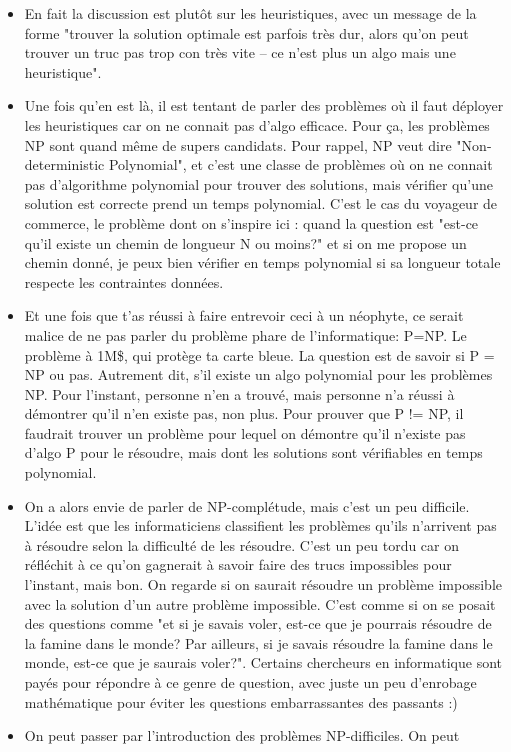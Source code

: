 \documentclass[a4paper]{article}
\begin{document}
\begin{itemize}
\begin{itemize}
\item En fait la discussion est plutôt sur les heuristiques, avec un message de
la forme "trouver la solution optimale est parfois très dur, alors qu'on peut
trouver un truc pas trop con très vite -- ce n'est plus un algo mais une
heuristique".
\item Une fois qu'en est là, il est tentant de parler des problèmes où il faut
déployer les heuristiques car on ne connait pas d'algo efficace. Pour ça, les
problèmes NP sont quand même de supers candidats. Pour rappel, NP veut dire
"Non-deterministic Polynomial", et c'est une classe de problèmes où on ne
connait pas d'algorithme polynomial pour trouver des solutions, mais vérifier
qu'une solution est correcte prend un temps polynomial. C'est le cas du
voyageur de commerce, le problème dont on s'inspire ici : quand la question est
"est-ce qu'il existe un chemin de longueur N ou moins?" et si on me propose un
chemin donné, je peux bien vérifier en temps polynomial si sa longueur totale
respecte les contraintes données.
\item Et une fois que t'as réussi à faire entrevoir ceci à un néophyte, ce
serait malice de ne pas parler du problème phare de l'informatique: P=NP. Le
problème à 1M\$, qui protège ta carte bleue. La question est de savoir si P =
NP ou pas. Autrement dit, s'il existe un algo polynomial pour les problèmes NP.
Pour l'instant, personne n'en a trouvé, mais personne n'a réussi à démontrer
qu'il n'en existe pas, non plus. Pour prouver que P != NP, il faudrait trouver
un problème pour lequel on démontre qu'il n'existe pas d'algo P pour le
résoudre, mais dont les solutions sont vérifiables en temps polynomial.
\item On a alors envie de parler de NP-complétude, mais c'est un peu difficile.
L'idée est que les informaticiens classifient les problèmes qu'ils n'arrivent
pas à résoudre selon la difficulté de les résoudre. C'est un peu tordu car on
réfléchit à ce qu'on gagnerait à savoir faire des trucs impossibles pour
l'instant, mais bon. On regarde si on saurait résoudre un problème impossible
avec la solution d'un autre problème impossible. C'est comme si on se posait
des questions comme "et si je savais voler, est-ce que je pourrais résoudre de
la famine dans le monde? Par ailleurs, si je savais résoudre la famine dans le
monde, est-ce que je saurais voler?". Certains chercheurs en informatique sont
payés pour répondre à ce genre de question, avec juste un peu d'enrobage
mathématique pour éviter les questions embarrassantes des passants :)
\item On peut passer par l'introduction des problèmes NP-difficiles. On peut

\end{itemize}
\end{itemize}
\end{document}
